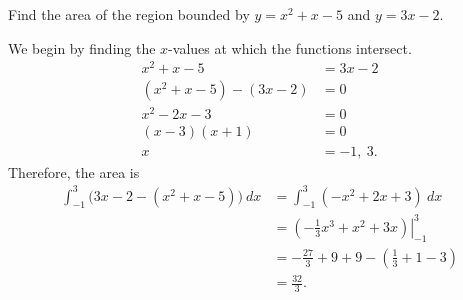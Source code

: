 \begin{example} %
Find the area of the region bounded by $y=x^2+x-5$ and $y=3x-2$.

\solution We begin by finding the $x$-values at which the functions intersect. 
\begin{align*} x^2+x-5 &= 3x-2 \\
(x^2+x-5) - (3x-2) &= 0\\
x^2-2x-3 &= 0\\
(x-3)(x+1) &= 0\\
x&=-1,\ 3.
\end{align*}
Therefore, the area is 
\begin{align*}
\int_{-1}^3\big(3x-2 -(x^2+x-5)\big)\ dx &= \int_{-1}^3 (-x^2+2x+3)\ dx \\
&=\left.\left(-\frac13x^3+x^2+3x\right)\right|_{-1}^3 \\
&=-\frac{27}{3}+9+9-\left(\frac13+1-3\right)\\
&= \frac{32}{3}.
\end{align*}
\end{example}